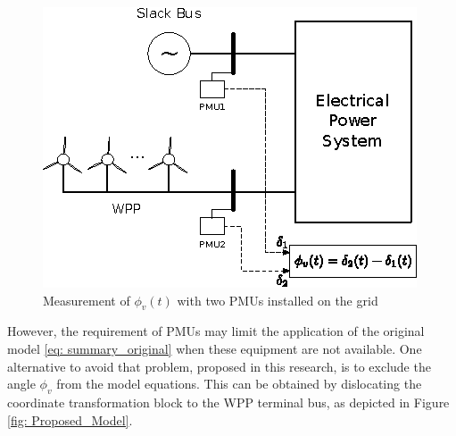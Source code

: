\begin{figure}[h]
	\caption{Measurement of $\phi_{v}(t)$ with two PMUs installed on the grid}
	\begin{center}
		\includegraphics[scale=1.5]{Images/pmu_example.eps}
	\end{center}
	\label{fig: PMU_grid}
\end{figure}

However, the requirement of PMUs may limit the application of the original model \eqref{eq: summary_original} when these equipment are not available. One alternative to avoid that problem, proposed in this research, is to exclude the angle $\phi_{v}$ from the model equations. This can be obtained by dislocating the coordinate transformation block to the WPP terminal bus, as depicted in Figure \ref{fig: Proposed_Model}.

